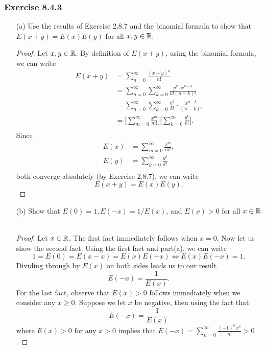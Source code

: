 \subsubsection{Exercise 8.4.3} 
\begin{enumerate}
    \item[(a)] Use the results of Exercise 2.8.7 and the binomial formula to show that \( E(x+y) = E(x)E(y)  \) for all \( x , y \in \mathbb{R}  \).
    \begin{proof}
    Let \( x, y \in \mathbb{R}  \). By definition of \( E(x+y)  \), using the binomial formula, we can write 
    \begin{align*}
        E(x+y)    &= \sum_{ n=0  }^{ \infty  } \frac{ (x+y)^{n}  }{  n!  }  \\
                  &= \sum_{ n=0 }^{ \infty  } \sum_{ k=0 }^{ \infty  } \frac{ y^{k } \cdot x^{n-k} }{  k! (n-k)!  }  \\
                  &= \sum_{ n=0  }^{ \infty  } \sum_{ k=0  }^{ \infty  } \frac{ y^{k }  }{  k!  }  \cdot \frac{ x^{n-k} }{ (n-k)!  } \\
                  &=  \Big[ \sum_{ m=0 }^{ \infty  } \frac{ x^{m} }{ m! }  \Big] \Big[ \sum_{ k = 0  }^{ \infty  } \frac{ y^{ k }  }{ k!  }  \Big] \tag{\( n-k = m \)}. \\
    \end{align*}
    Since 
    \begin{align*}
        E(x) &= \sum_{ m=0  }^{ \infty  } \frac{ x^{m}  }{ m!  },  \\
        E(y) &= \sum_{ k=0  }^{ \infty  } \frac{ y^{ k }  }{  k!  } \\
    \end{align*}
    both converge absolutely (by Exercise 2.8.7), we can write 
    \[  E(x+y) = E(x)E(y). \]
    \end{proof}
    \item[(b)] Show that \( E(0) = 1, E(-x) = 1 / E(x)  \), and \( E(x) > 0  \) for all \( x \in \mathbb{R}  \).
        \begin{proof}
        Let \( x \in \mathbb{R}  \). The first fact immediately follows when \( x = 0  \). Now let us show the second fact. Using the first fact and part(a), we can write 
        \[   1 = E(0) = E(x - x ) = E(x) E(-x) \iff E(x)E(-x) = 1.   \] 
        Dividing through by \( E(x)  \) on both sides leads us to our result 
        \[  E(-x) = \frac{ 1 }{ E(x)  }. \]  For the last fact, observe that \( E(x) > 0  \) follows immediately when we consider any \( x \geq 0  \). Suppose we let \( x  \) be negative, then using the fact that 
        \[  E(-x) = \frac{ 1 }{ E(x)  }   \] where \( E(x) > 0  \) for any \( x > 0  \) implies that \( E(-x) = \sum_{ n=0 }^{ \infty  } \frac{ (-1)^{n} x^{n}  }{  n!  } > 0    \).
        \end{proof}
\end{enumerate}

